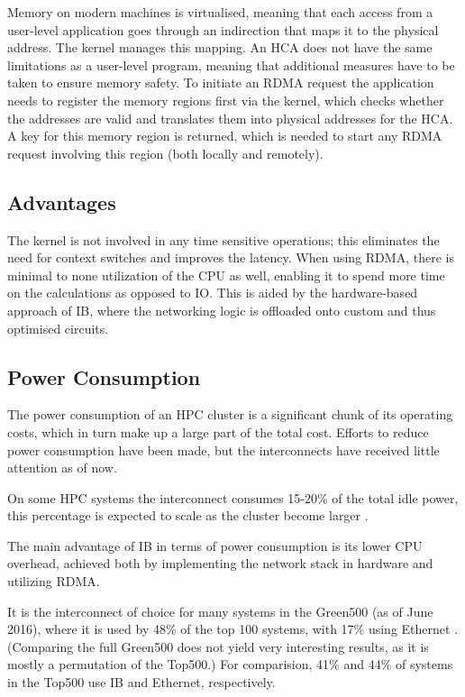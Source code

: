 \documentclass[12pt, a4paper]{article}
\begin{document}
Memory on modern machines is virtualised, meaning that each access from a user-level application goes through an indirection that maps it to the physical address. The kernel manages this mapping. An HCA does not have the same limitations as a user-level program, meaning that additional measures have to be taken to ensure memory safety. To initiate an RDMA request the application needs to register the memory regions first via the kernel, which checks whether the addresses are valid and translates them into physical addresses for the HCA. A key for this memory region is returned, which is needed to start any RDMA request involving this region (both locally and remotely).

\subsection{Advantages}
The kernel is not involved in any time sensitive operations; this eliminates the need for context switches and improves the latency. When using RDMA, there is minimal to none utilization of the CPU as well, enabling it to spend more time on the calculations as opposed to IO. This is aided by the hardware-based approach of IB, where the networking logic is offloaded onto custom and thus optimised circuits.

\subsection{Power Consumption}
The power consumption of an HPC cluster is a significant chunk of its operating costs, which in turn make up a large part of the total cost. Efforts to reduce power consumption have been made, but the interconnects have received little attention as of now.

On some HPC systems the interconnect consumes 15-20\% of the total idle power, this percentage is expected to scale as the cluster become larger \cite{hoefler2010software}.

The main advantage of IB in terms of power consumption is its lower CPU overhead, achieved both by implementing the network stack in hardware and utilizing RDMA.

It is the interconnect of choice for many systems in the Green500 (as of June 2016), where it is used by 48\% of the top 100 systems, with 17\% using Ethernet \cite{green500list}. (Comparing the full Green500 does not yield very interesting results, as it is mostly a permutation of the Top500.) For comparision, 41\% and 44\% of systems in the Top500 use IB and Ethernet, respectively.
\end{document}
